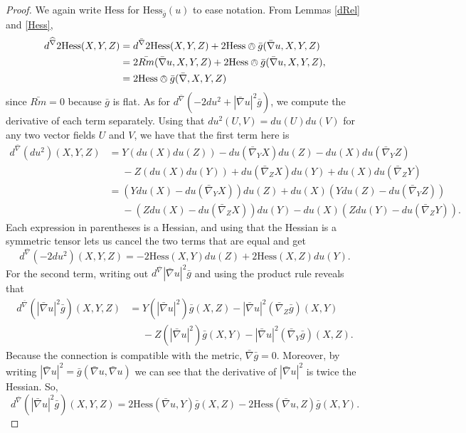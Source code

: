 \documentclass{amsart}
\numberwithin{equation}{section}
\begin{document}
\begin{proof}
We again write $\mathrm{Hess}$ for $\mathrm{Hess}_{\bar{g}}(u)$ to ease notation. 
From Lemmas \ref{dRel} and \ref{Hess}, 
\begin{equation}
\label{SimpDerHess}
\begin{aligned}
d^{\widehat{\nabla}}2\mathrm{Hess}(X,Y,Z)
&= d^{\bar{\nabla}}2\mathrm{Hess}(X,Y,Z) + 2\mathrm{Hess}\owedge \bar{g}(\bar{\nabla}u,X,Y,Z) \\
&= 2\bar{Rm}(\bar{\nabla}u,X,Y,Z) + 2\mathrm{Hess}\owedge \bar{g}(\bar{\nabla}u,X,Y,Z), \\
&= 2\mathrm{Hess}\owedge \bar{g}(\bar{\nabla},X,Y,Z)
\end{aligned}
\end{equation}
since $\bar{Rm} = 0$ because $\bar{g}$ is flat. 
As for $d^{\bar{\nabla}}(- 2 du^2 + |\bar{\nabla}u|^2 \bar{g})$, we compute the derivative of each term separately.
Using that $du^2(U,V) = du(U)du(V)$ for any two vector fields $U$ and $V$, we have that the first term here is 
\begin{align*}
d^{\bar{\nabla}}(du^2)(X,Y,Z)
&= Y(du(X)du(Z)) - du(\bar{\nabla}_YX)du(Z) - du(X)du(\bar{\nabla}_YZ) \\
&\phantom{=} - Z(du(X)du(Y)) + du(\bar{\nabla}_ZX)du(Y) + du(X)du(\bar{\nabla}_ZY) \\[2mm]
&= (Ydu(X) - du(\bar{\nabla}_YX))du(Z) + du(X)(Ydu(Z)-du(\bar{\nabla}_YZ)) \\
&\phantom{=} - (Zdu(X) - du(\bar{\nabla}_ZX))du(Y) - du(X)(Zdu(Y)-du(\bar{\nabla}_ZY)).
\end{align*}
Each expression in parentheses is a Hessian, and using that the Hessian is a symmetric tensor lets us cancel the two terms that are equal and get 
\begin{equation}
\label{Derdu}
d^{\bar{\nabla}}(-2du^2)(X,Y,Z) = -2\mathrm{Hess}(X,Y)du(Z) +2\mathrm{Hess}(X,Z)du(Y).
\end{equation}
For the second term, writing out $d^{\bar{\nabla}}|\bar{\nabla}u|^2 \bar{g}$ and using the product rule reveals that 
\begin{align*}
d^{\bar{\nabla}}(|\bar{\nabla}u|^2 \bar{g})(X,Y,Z) 
&= Y(|\bar{\nabla}u|^2)\bar{g}(X,Z) - |\bar{\nabla}u|^2 (\bar{\nabla}_Z\bar{g})(X,Y) \\
&\phantom{=} - Z(|\bar{\nabla}u|^2)\bar{g}(X,Y) - |\bar{\nabla}u|^2(\bar{\nabla}_Y\bar{g})(X,Z).
\end{align*}
Because the connection is compatible with the metric, $\bar{\nabla}\bar{g} = 0$. 
Moreover, by writing $|\bar{\nabla}u|^2 = \bar{g}(\bar{\nabla} u, \bar{\nabla}u)$ we can see that the derivative of $|\bar{\nabla}u|^2$ is twice the Hessian.
So, 
\begin{equation}
\label{DerNorm}
d^{\bar{\nabla}}(|\bar{\nabla} u|^2\bar{g})(X,Y,Z)
= 2\mathrm{Hess}(\bar{\nabla}u,Y)\bar{g}(X,Z) - 2\mathrm{Hess}(\bar{\nabla}u,Z)\bar{g}(X,Y).
\end{equation}


\end{proof}
\end{document}
